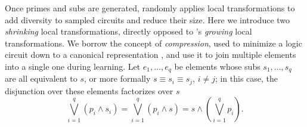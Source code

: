 Once primes and subs are generated,  randomly applies local transformations to
add diversity to sampled circuits and reduce their size. Here we introduce two \emph{shrinking}
local transformations, directly opposed to \incrclass{}'s \emph{growing} local transformations. We
borrow the concept of \emph{compression}, used to minimize a logic circuit down to a canonical
representation \citep{darwiche11}, and use it to join multiple elements into a single one during
learning. Let $e_1,\ldots,e_q$ be elements whose subs $s_1,\ldots,s_q$ are all equivalent to $s$,
or more formally $s\equiv s_i\equiv s_j$, $i\neq j$; in this case, the disjunction over these
elements factorizes over $s$
\begin{equation}
  \bigvee_{i=1}^q (p_i\wedge s_i)=\bigvee_{i=1}^q (p_i\wedge s)=s\wedge\left(\bigvee_{i=1}^q p_i\right).
\end{equation}

